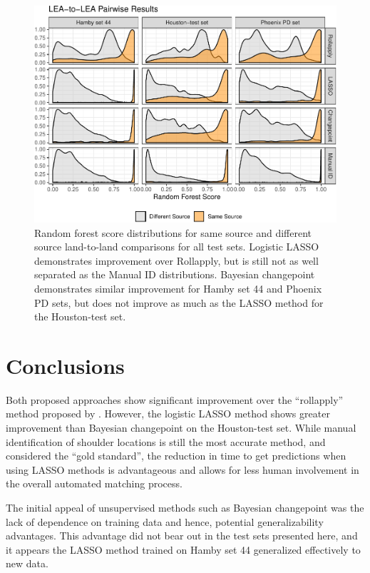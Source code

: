 \documentclass[12pt]{article}
\begin{document}
\begin{figure}
\centering
\includegraphics{writeup_files/figure-latex/all-results-1.pdf}
\caption{\label{houston-groove-results}Random forest score distributions
for same source and different source land-to-land comparisons for all
test sets. Logistic LASSO demonstrates improvement over Rollapply, but
is still not as well separated as the Manual ID distributions. Bayesian
changepoint demonstrates similar improvement for Hamby set 44 and
Phoenix PD sets, but does not improve as much as the LASSO method for
the Houston-test set.}
\end{figure}

\section{Conclusions}

Both proposed approaches show significant improvement over the
``rollapply'' method proposed by \cite{Hare1}. However, the logistic
LASSO method shows greater improvement than Bayesian changepoint on the
Houston-test set. While manual identification of shoulder locations is
still the most accurate method, and considered the ``gold standard'',
the reduction in time to get predictions when using LASSO methods is
advantageous and allows for less human involvement in the overall
automated matching process.

The initial appeal of unsupervised methods such as Bayesian changepoint
was the lack of dependence on training data and hence, potential
generalizability advantages. This advantage did not bear out in the test
sets presented here, and it appears the LASSO method trained on Hamby
set 44 generalized effectively to new data.
\end{document}
